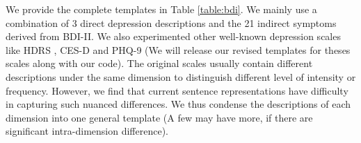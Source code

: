 We provide the complete templates in Table \ref{table:bdi}. We mainly use a combination of 3 direct depression descriptions and the 21 indirect symptoms derived from BDI-II. We also experimented other well-known depression scales like HDRS \citep{hamilton1986hamilton}, CES-D \citep{Lenore1977CES-D} and PHQ-9 \citep{kroenke2001phq} (We will release our revised templates for theses scales along with our code). The original scales usually contain different descriptions under the same dimension to distinguish different level of intensity or frequency. However, we find that current sentence representations have difficulty in capturing such nuanced differences. We thus condense the descriptions of each dimension into one general template (A few may have more, if there are significant intra-dimension difference).
